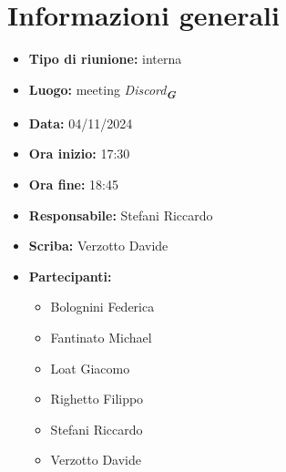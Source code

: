


\section{Informazioni generali}

\begin{itemize}
    \item \textbf{Tipo di riunione:} interna
    \item \textbf{Luogo:} meeting \emph{Discord}\textsubscript{\textit{\textbf{G}}}
    \item \textbf{Data:} 04/11/2024
    \item \textbf{Ora inizio:} 17:30
    \item \textbf{Ora fine:} 18:45
    \item \textbf{Responsabile:} Stefani Riccardo
    \item \textbf{Scriba:} Verzotto Davide
    \item \textbf{Partecipanti:}
    \begin{itemize}
        \renewcommand{\labelitemii}{--}
        \item Bolognini Federica
        \item Fantinato Michael
        \item Loat Giacomo
        \item Righetto Filippo
        \item Stefani Riccardo
        \item Verzotto Davide
    \end{itemize}
\end{itemize}
